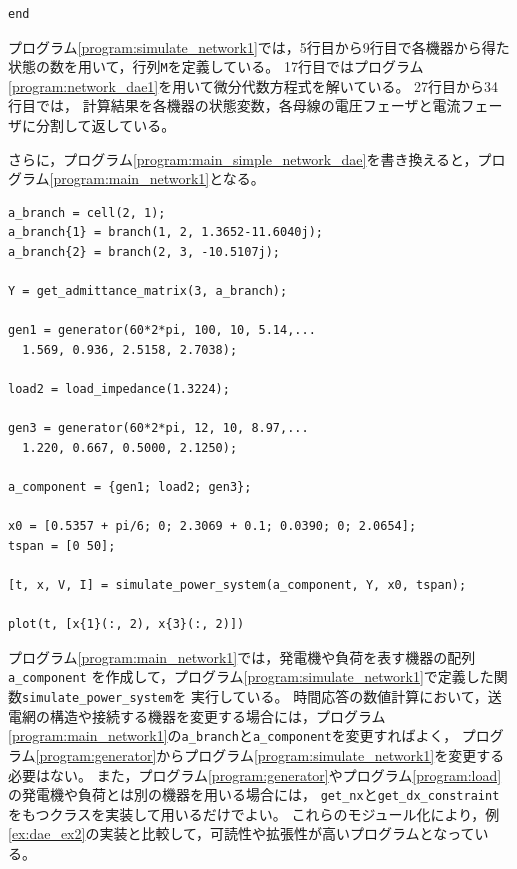\documentclass[tombow,dvipdfmx]{corona-a5-1.1}
\begin{document}
\begin{例}[発電機と負荷のモジュール化]
\begin{PROGRAMA}[count,title={simulate\_power\_system.m}]
\begin{verbatim}
end
\end{verbatim}
\end{PROGRAMA}

プログラム\nobreak\ref{program:simulate_network1}では，5行目から9行目で各機器から得た
状態の数を用いて，行列\verb|M|を定義している。
17行目ではプログラム\nobreak\ref{program:network_dae1}を用いて微分代数方程式を解いている。
27行目から34行目では，
計算結果を各機器の状態変数，各母線の電圧フェーザと電流フェーザに分割して返している。


さらに，プログラム\nobreak\ref{program:main_simple_network_dae}を書き換えると，プログラム\nobreak\ref{program:main_network1}となる。

\smallskip
\begin{PROGRAMA}[count,title={main\_simulation\_3bus.m}]\label{program:main_network1}
\begin{verbatim}
a_branch = cell(2, 1);
a_branch{1} = branch(1, 2, 1.3652-11.6040j);
a_branch{2} = branch(2, 3, -10.5107j);

Y = get_admittance_matrix(3, a_branch);

gen1 = generator(60*2*pi, 100, 10, 5.14,...
  1.569, 0.936, 2.5158, 2.7038);

load2 = load_impedance(1.3224);

gen3 = generator(60*2*pi, 12, 10, 8.97,...
  1.220, 0.667, 0.5000, 2.1250);

a_component = {gen1; load2; gen3};

x0 = [0.5357 + pi/6; 0; 2.3069 + 0.1; 0.0390; 0; 2.0654];
tspan = [0 50];

[t, x, V, I] = simulate_power_system(a_component, Y, x0, tspan);

plot(t, [x{1}(:, 2), x{3}(:, 2)])
\end{verbatim}
\end{PROGRAMA}

プログラム\nobreak\ref{program:main_network1}では，発電機や負荷を表す機器の配列\verb|a_component|
を作成して，プログラム\nobreak\ref{program:simulate_network1}で定義した関数\verb|simulate_power_system|を
実行している。
時間応答の数値計算において，送電網の構造や接続する機器を変更する場合には，プログラム
\ref{program:main_network1}の\verb|a_branch|と\verb|a_component|を変更すればよく，
プログラム\nobreak\ref{program:generator}からプログラム\ref{program:simulate_network1}を変更する必要はない。
また，プログラム\nobreak\ref{program:generator}やプログラム\ref{program:load}の発電機や負荷とは別の機器を用いる場合には，
\verb|get_nx|と\verb|get_dx_constraint|をもつクラスを実装して用いるだけでよい。
これらのモジュール化により，例\ref{ex:dae_ex2}の実装と比較して，可読性や拡張性が高いプログラムとなっている。
\end{例}
\end{document}

